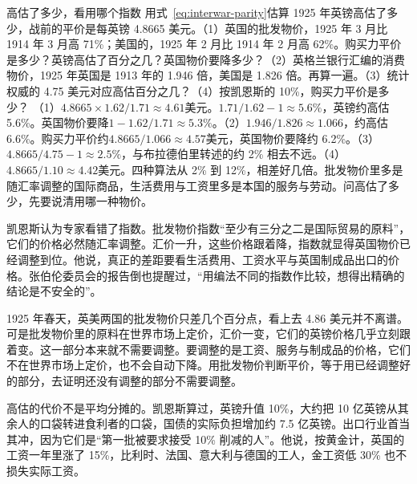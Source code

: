 \begin{example}{高估了多少，看用哪个指数}\label{ex:interwar-index}
用式~\eqref{eq:interwar-parity}估算 1925 年英镑高估了多少，战前的平价是每英镑 4.8665 美元。（1）英国的批发物价，1925 年 3 月比 1914 年 3 月高 71\%；美国的，1925 年 2 月比 1914 年 2 月高 62\%\cite{hansard1925}。购买力平价是多少？英镑高估了百分之几？英国物价要降多少？（2）英格兰银行汇编的消费物价，1925 年英国是 1913 年的 1.946 倍，美国是 1.826 倍\cite{boe2017}。再算一遍。（3）统计权威的 4.75 美元对应高估百分之几？（4）按凯恩斯的 10\%，购买力平价是多少？
\solution （1）$4.8665\times1.62/1.71\approx4.61$美元。$1.71/1.62-1\approx5.6\%$，英镑约高估 5.6\%。英国物价要降$1-1.62/1.71\approx5.3\%$。（2）$1.946/1.826\approx1.066$，约高估 6.6\%。购买力平价约$4.8665/1.066\approx4.57$美元，英国物价要降约 6.2\%。（3）$4.8665/4.75-1\approx2.5\%$，与布拉德伯里转述的约 2\% 相去不远。（4）$4.8665/1.10\approx4.42$美元。四种算法从 2\% 到 12\%，相差好几倍。批发物价里多是随汇率调整的国际商品，生活费用与工资里多是本国的服务与劳动。问高估了多少，先要说清用哪一种物价。
\end{example}

凯恩斯认为专家看错了指数。批发物价指数“至少有三分之二是国际贸易的原料”，它们的价格必然随汇率调整\cite{keynes1925}。汇价一升，这些价格跟着降，指数就显得英国物价已经调整到位。他说，真正的差距要看生活费用、工资水平与英国制成品出口的价格\cite{keynes1925}。张伯伦委员会的报告倒也提醒过，“用编法不同的指数作比较，想得出精确的结论是不安全的”\cite{hansardlords1925}。

\begin{pitfall}
1925 年春天，英美两国的批发物价只差几个百分点，看上去 4.86 美元并不离谱。可是批发物价里的原料在世界市场上定价，汇价一变，它们的英镑价格几乎立刻跟着变。这一部分本来就不需要调整。要调整的是工资、服务与制成品的价格，它们不在世界市场上定价，也不会自动下降。用批发物价判断平价，等于用已经调整好的部分，去证明还没有调整的部分不需要调整。
\end{pitfall}

高估的代价不是平均分摊的。凯恩斯算过，英镑升值 10\%，大约把 10 亿英镑从其余人的口袋转进食利者的口袋，国债的实际负担增加约 7.5 亿英镑\cite{keynes1925}。出口行业首当其冲，因为它们是“第一批被要求接受 10\% 削减的人”\cite{keynes1925}。他说，按黄金计，英国的工资一年里涨了 15\%，比利时、法国、意大利与德国的工人，金工资低 30\% 也不损失实际工资\cite{keynes1925}。

